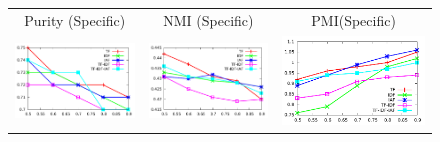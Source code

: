 \documentclass[10pt,a5paper,twoside]{article}
\begin{document}
\begin{figure}[t!]
\begin{center}
{\begin{tabular}{ccc}
		{\Large Purity (Specific)} & {\Large NMI (Specific)} & 
		{\Large PMI(Specific)}\\


		\includegraphics[width=350pt]{Figs/3-1.pdf} & 
		\includegraphics[width=350pt]{Figs/3-2.pdf} & 
		\includegraphics[width=350pt]{Figs/3-3.pdf} \\


\end{tabular}}
\end{center}
\end{figure}
\end{document}
